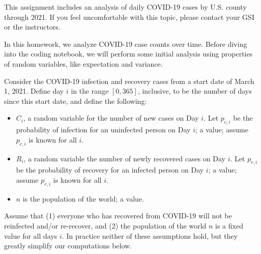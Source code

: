 \documentclass[addpoints, 12pt]{exam}
\theoremstyle{definition}
\begin{document}
\noindent This assignment includes an analysis of daily COVID-19 cases by U.S. county through 2021. If you feel uncomfortable with this topic, please contact your GSI or the instructors.

\newpage



\noindent In this homework, we analyze COVID-19 case counts over time. Before diving into the coding notebook, we will perform some initial analysis using properties of random variables, like expectation and variance.

\noindent Consider the COVID-19 infection and recovery cases from a start date of March 1, 2021. Define day $i$ in the range $[0, 365]$, inclusive, to be the number of days since this start date, and define the following:

\begin{itemize}
    \item $C_i$, a random variable for the number of new cases on Day $i$. Let $p_{c,i}$ be the probability of infection for an uninfected person on Day $i$; a value; assume $p_{c,i}$ is known for all $i$.
    \item $R_i$, a random variable the number of newly recovered cases on Day $i$. Let $p_{r,i}$ be the probability of recovery for an infected person on Day $i$; a value; assume $p_{r,i}$ is known for all $i$.
    \item $n$ is the population of the world; a value.
\end{itemize}

\noindent Assume that (1) everyone who has recovered from COVID-19 will not be reinfected and/or re-recover, and (2) the population of the world $n$ is a fixed value for all days $i$. In practice neither of these assumptions hold, but they greatly simplify our computations below.
\end{document}
